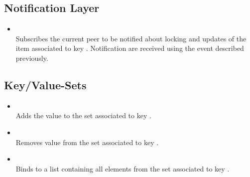 \subsection{Notification Layer}

\begin{itemize}

\item {}\\ Subscribes the current peer to be notified
about locking and updates of the item associated to key .
Notification are received using the  event described previously.

\end{itemize}

\subsection{Key/Value-Sets}

\begin{itemize}

\item {}\\ Adds the value  to the set associated to
key .

\item {}\\ Removes value  from the set associated
to key .

\item {}\\ Binds  to a list containing all
elements from the set associated to key . 

\end{itemize}
